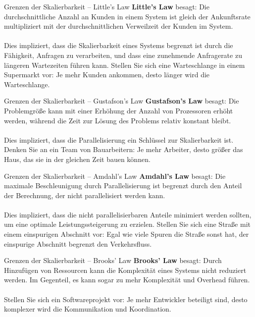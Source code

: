 \documentclass{beamer}
\begin{document}
\begin{frame}{Grenzen der Skalierbarkeit -- Little's Law}
    \textbf{Little's Law} besagt: Die durchschnittliche Anzahl an Kunden in einem System ist gleich der Ankunftsrate multipliziert mit der durchschnittlichen Verweilzeit der Kunden im System.  
    \mbox{}\\    \mbox{}\\
    Dies impliziert, dass die Skalierbarkeit eines Systems begrenzt ist durch die Fähigkeit, Anfragen zu verarbeiten, und dass eine zunehmende Anfragerate zu längeren Wartezeiten führen kann.  Stellen Sie sich eine Warteschlange in einem Supermarkt vor: Je mehr Kunden ankommen, desto länger wird die Warteschlange.
\end{frame}



\begin{frame}{Grenzen der Skalierbarkeit -- Gustafson's Law}
\textbf{Gustafson's Law} besagt: Die Problemgröße kann mit einer Erhöhung der Anzahl von Prozessoren erhöht werden, während die Zeit zur Lösung des Problems relativ konstant bleibt. 
\mbox{}\\    \mbox{}\\
Dies impliziert, dass die Parallelisierung ein Schlüssel zur Skalierbarkeit ist.  Denken Sie an ein Team von Bauarbeitern:  Je mehr Arbeiter, desto größer das Haus, das sie in der gleichen Zeit bauen können.
\end{frame}

\begin{frame}{Grenzen der Skalierbarkeit -- Amdahl's Law}
    \textbf{Amdahl's Law} besagt:  Die maximale Beschleunigung durch Parallelisierung ist begrenzt durch den Anteil der Berechnung, der nicht parallelisiert werden kann.  
    \mbox{}\\     \mbox{}\\
    Dies impliziert, dass die nicht parallelisierbaren Anteile minimiert werden sollten, um eine optimale Leistungssteigerung zu erzielen.  Stellen Sie sich eine Straße mit einem einspurigen Abschnitt vor:  Egal wie viele Spuren die Straße sonst hat, der einspurige Abschnitt begrenzt den Verkehrsfluss.

\end{frame}

\begin{frame}{Grenzen der Skalierbarkeit -- Brooks' Law}
 \textbf{Brooks' Law} besagt: Durch Hinzufügen von Ressourcen kann die Komplexität eines Systems nicht reduziert werden.  Im Gegenteil, es kann sogar zu mehr Komplexität und Overhead führen.  
 \mbox{}\\    \mbox{}\\
 Stellen Sie sich ein Softwareprojekt vor: Je mehr Entwickler beteiligt sind, desto komplexer wird die Kommunikation und Koordination.
\end{frame}
\end{document}
